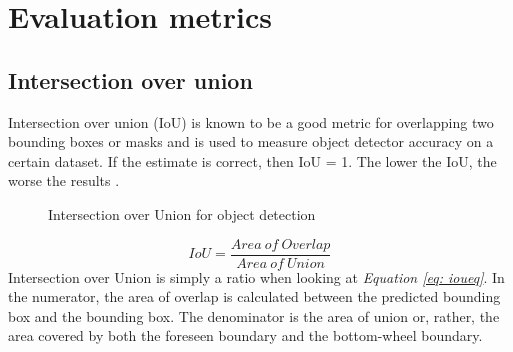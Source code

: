 \section{Evaluation metrics}
\subsection{Intersection over union}
Intersection over union (IoU) is known to be a good metric for overlapping two bounding boxes or masks and is used to measure object detector accuracy on a certain dataset. If the estimate is correct, then IoU = 1. The lower the IoU, the worse the results \cite{sheremet_intersection_2020}.

\begin{figure}[h]
    \centering
    \hfill
    \caption{Intersection over Union for object detection \cite{rosebrock_intersection_2016}}
    \label{figure: iou}
\end{figure}

\begin{equation}
    IoU = \frac{Area\ of\ Overlap}{Area\ of\ Union} \label{eq: ioueq}
\end{equation}
\vspace{0.5cm}
Intersection over Union is simply a ratio when looking at \textit{Equation \ref{eq: ioueq}}. In the numerator, the area of overlap is calculated between the predicted bounding box and the bounding box.
The denominator is the area of union or, rather, the area covered by both the foreseen boundary and the bottom-wheel boundary\cite{uavs_comparing_2019}.
\clearpage
